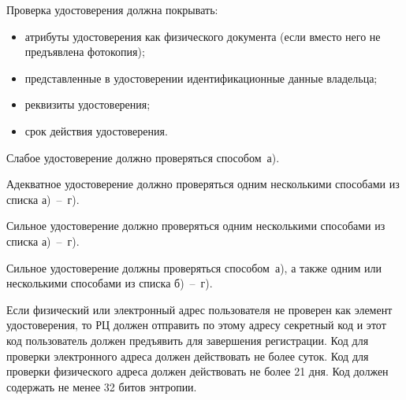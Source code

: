 

Проверка удостоверения должна покрывать:
\begin{itemize}
\item
атрибуты удостоверения как физического документа 
(если вместо него не предъявлена фотокопия);
\item
представленные в удостоверении идентификационные данные владельца;
\item
реквизиты удостоверения;
\item
срок действия удостоверения.
\end{itemize}


Слабое удостоверение должно проверяться способом~а).


Адекватное удостоверение должно проверяться одним  несколькими 
способами из списка а)~--~г).


Сильное удостоверение должно проверяться одним  несколькими 
способами из списка а)~--~г).

Сильное удостоверение должны проверяться способом~а), 
а также одним или несколькими способами из списка б)~--~г).



Если физический или электронный адрес пользователя не проверен
как элемент удостоверения, то РЦ должен отправить по этому 
адресу секретный код и этот код пользователь должен предъявить 
для завершения регистрации. 
%
Код для проверки электронного адреса должен действовать не более суток.
%
Код для проверки физического адреса должен действовать не более 21 дня.
%
Код должен содержать не менее 32 битов энтропии.

